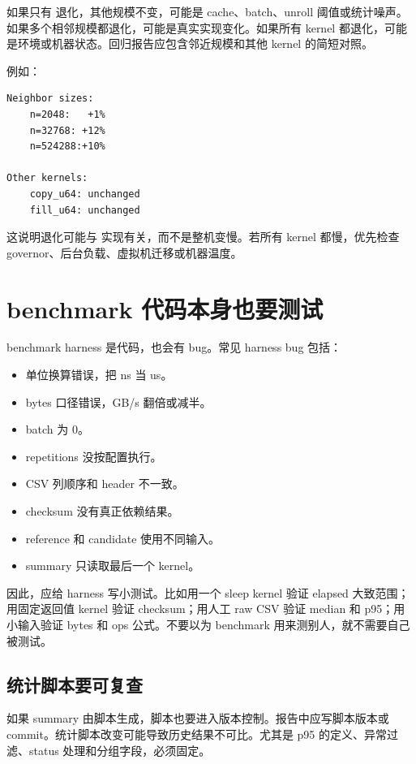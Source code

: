如果只有  退化，其他规模不变，可能是 cache、batch、unroll 阈值或统计噪声。如果多个相邻规模都退化，可能是真实实现变化。如果所有 kernel 都退化，可能是环境或机器状态。回归报告应包含邻近规模和其他 kernel 的简短对照。

例如：

\begin{lstlisting}
Neighbor sizes:
    n=2048:   +1%
    n=32768: +12%
    n=524288:+10%

Other kernels:
    copy_u64: unchanged
    fill_u64: unchanged
\end{lstlisting}

这说明退化可能与  实现有关，而不是整机变慢。若所有 kernel 都慢，优先检查 governor、后台负载、虚拟机迁移或机器温度。

\section{benchmark 代码本身也要测试}

benchmark harness 是代码，也会有 bug。常见 harness bug 包括：

\begin{itemize}
  \item 单位换算错误，把 ns 当 us。
  \item bytes 口径错误，GB/s 翻倍或减半。
  \item batch 为 0。
  \item repetitions 没按配置执行。
  \item CSV 列顺序和 header 不一致。
  \item checksum 没有真正依赖结果。
  \item reference 和 candidate 使用不同输入。
  \item summary 只读取最后一个 kernel。
\end{itemize}

因此，应给 harness 写小测试。比如用一个 sleep kernel 验证 elapsed 大致范围；用固定返回值 kernel 验证 checksum；用人工 raw CSV 验证 median 和 p95；用小输入验证 bytes 和 ops 公式。不要以为 benchmark 用来测别人，就不需要自己被测试。

\subsection{统计脚本要可复查}

如果 summary 由脚本生成，脚本也要进入版本控制。报告中应写脚本版本或 commit。统计脚本改变可能导致历史结果不可比。尤其是 p95 的定义、异常过滤、status 处理和分组字段，必须固定。

